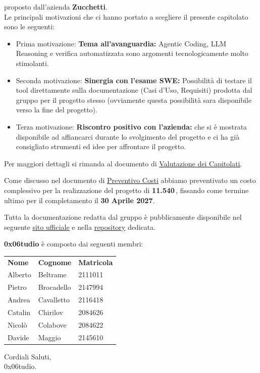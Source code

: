 \documentclass[a4paper, 11pt]{article}
\newcommand{\gruppo}{0x06tudio}
\newcommand{\azienda}{Zucchetti}
\newcommand{\costo}{11.540\,\texteuro}
\newcommand{\scadenza}{30 Aprile 2027}
\newcommand{\linksott}[2]{\href{#1}{\uline{#2}}}
\newcommand{\urlvalutazione}{https://github.com/0x06tudio/docs/blob/5c52c6d0a37181c3c0dc6ac414c8361ffdf0bb08/out/verbali/candidatura/resoconto_capitolati.pdf}
\newcommand{\urlpreventivo}{https://github.com/0x06tudio/docs/blob/5c52c6d0a37181c3c0dc6ac414c8361ffdf0bb08/out/verbali/candidatura/preventivo_costi_e_impegni_orari.pdf}
\newcommand{\urlsito}{https://example.com}
\newcommand{\urlrepo}{https://github.com/0x06tudio/docs}
\newcommand{\membri}{%
    Alberto & Beltrame & 2111011 \\
    Pietro & Brocadello & 2147994 \\
    Andrea & Cavalletto & 2116418 \\
    Catalin & Chirilov & 2084626 \\
    Nicolò & Colabove & 2084622 \\
    Davide & Maggio & 2145610 \\
}
\begin{document}
\noindent proposto dall'azienda \textbf{\azienda}.\\
Le principali motivazioni che ci hanno portato a scegliere il presente capitolato sono le seguenti:

\begin{itemize}
    \item Prima motivazione: \textbf{Tema all'avanguardia:} Agentic Coding, LLM Reasoning e verifica automatizzata sono argomenti tecnologicamente molto stimolanti. 
    \item Seconda motivazione: \textbf{Sinergia con l'esame SWE:} Possibilità di testare il tool direttamente sulla documentazione (Casi d'Uso, Requisiti) prodotta dal gruppo per il progetto stesso (ovviamente questa possibilità sara disponibile verso la fine del progetto).
    \item Terza motivazione: \textbf{Riscontro positivo con l'azienda:} che si è mostrata disponibile ad affiancarci durante lo svolgimento del progetto e ci ha già consigliato strumenti ed idee per affrontare il progetto.
\end{itemize}

\noindent Per maggiori dettagli si rimanda al documento di \linksott{\urlvalutazione}{Valutazione dei Capitolati}.

\vspace{0.3cm}

\noindent Come discusso nel documento di \linksott{\urlpreventivo}{Preventivo Costi} abbiamo preventivato un costo complessivo per la realizzazione del progetto di \textbf{\costo}, fissando come termine ultimo per il completamento il \textbf{\scadenza}.

\vspace{0.3cm}

\noindent Tutta la documentazione redatta dal gruppo è pubblicamente disponibile nel seguente \linksott{\urlsito}{sito ufficiale} e nella \linksott{\urlrepo}{repository} dedicata.

\vspace{0.5cm}
\noindent \textbf{\gruppo} è composto dai seguenti membri:

\begin{center}
    \begin{tabular}{lll}
        \textbf{Nome} & \textbf{Cognome} & \textbf{Matricola} \\
        \membri
    \end{tabular}
\end{center}

\vspace{0.5cm}

\noindent Cordiali Saluti,\\
\gruppo.
\end{document}
